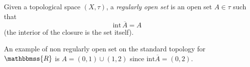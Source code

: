 \documentclass{article}
\newcommand{\R}{\mathbbmss{R}}
\begin{document}
Given a topological space $(X,\tau)$, a \emph{regularly open set} is an open set $A\in \tau$ such that 
$$\mathrm{int}\, \overline{A}=A$$
(the interior of the closure is the set itself).

An example of non regularly open set on the standard topology for $\R$ is
$A=(0,1)\cup(1,2)$ since $\mathrm{int}\overline{A}=(0,2)$.
\end{document}
